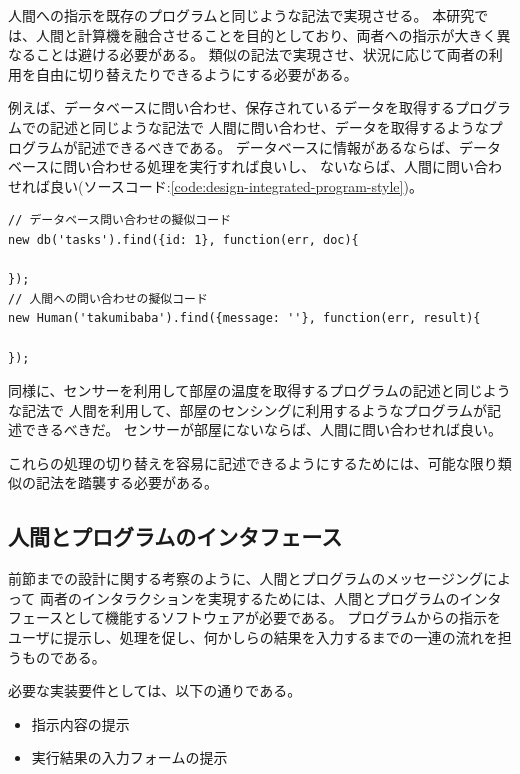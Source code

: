 人間への指示を既存のプログラムと同じような記法で実現させる。
本研究では、人間と計算機を融合させることを目的としており、両者への指示が大きく異なることは避ける必要がある。
類似の記法で実現させ、状況に応じて両者の利用を自由に切り替えたりできるようにする必要がある。

例えば、データベースに問い合わせ、保存されているデータを取得するプログラムでの記述と同じような記法で
人間に問い合わせ、データを取得するようなプログラムが記述できるべきである。
データベースに情報があるならば、データベースに問い合わせる処理を実行すれば良いし、
ないならば、人間に問い合わせれば良い(ソースコード:\ref{code:design-integrated-program-style})。

\begin{lstlisting}[caption=人間への指示を計算機への指示と類似させる, label=code:design-integrated-program-style]
// データベース問い合わせの擬似コード
new db('tasks').find({id: 1}, function(err, doc){

});
// 人間への問い合わせの擬似コード
new Human('takumibaba').find({message: ''}, function(err, result){

});
\end{lstlisting}

同様に、センサーを利用して部屋の温度を取得するプログラムの記述と同じような記法で
人間を利用して、部屋のセンシングに利用するようなプログラムが記述できるべきだ。
センサーが部屋にないならば、人間に問い合わせれば良い。

これらの処理の切り替えを容易に記述できるようにするためには、可能な限り類似の記法を踏襲する必要がある。

\subsection{人間とプログラムのインタフェース}\label{ux4ebaux9593ux3068ux30d7ux30edux30b0ux30e9ux30e0ux306eux30a4ux30f3ux30bfux30d5ux30a7ux30fcux30b9}

前節までの設計に関する考察のように、人間とプログラムのメッセージングによって
両者のインタラクションを実現するためには、人間とプログラムのインタフェースとして機能するソフトウェアが必要である。
プログラムからの指示をユーザに提示し、処理を促し、何かしらの結果を入力するまでの一連の流れを担うものである。

必要な実装要件としては、以下の通りである。

\begin{itemize}
\itemsep1pt\parskip0pt
\item
  指示内容の提示
\item
  実行結果の入力フォームの提示
\end{itemize}

